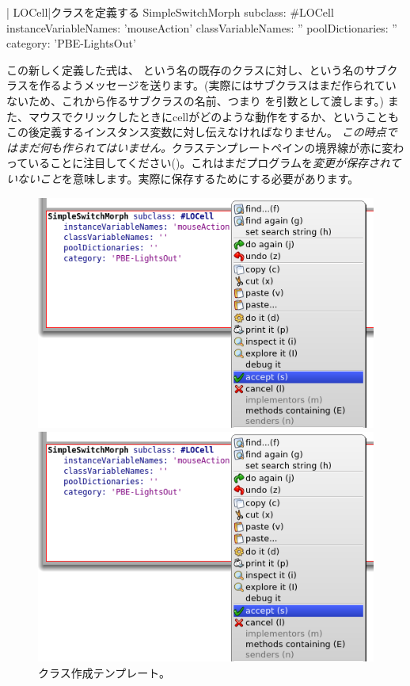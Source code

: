 \documentclass[a4paper,10pt,twoside]{book}
\begin{document}
\begin{classdef}[firstClassDef]{\ct| LOCell|クラスを定義する}
SimpleSwitchMorph subclass: #LOCell
   instanceVariableNames: 'mouseAction'
   classVariableNames: ''
   poolDictionaries: ''
   category: 'PBE-LightsOut'
\end{classdef}

この新しく定義した\st 式は、 という名の既存のクラスに対し、という名のサブクラスを作るようメッセージを送ります。(実際にはサブクラスはまだ作られていないため、これから作るサブクラスの名前、つまり を引数として渡します。)
また、マウスでクリックしたときにcellがどのような動作をするか、ということもこの後定義するインスタンス変数に対し伝えなければなりません。
\emph{この時点ではまだ何も作られてはいません。}クラステンプレートペインの境界線が赤に変わっていることに注目してください()。これはまだプログラムを\emph{変更が保存されていないこと}を意味します。実際に保存するためにする必要があります。

\begin{figure}[h!t]
\ifluluelse
	{\centerline {\includegraphics[width=\textwidth]{AcceptClassDef}}}
	{\centerline {\includegraphics[scale=0.7]{AcceptClassDef}}}
\caption{クラス作成テンプレート。
}
\end{figure}
\end{document}
